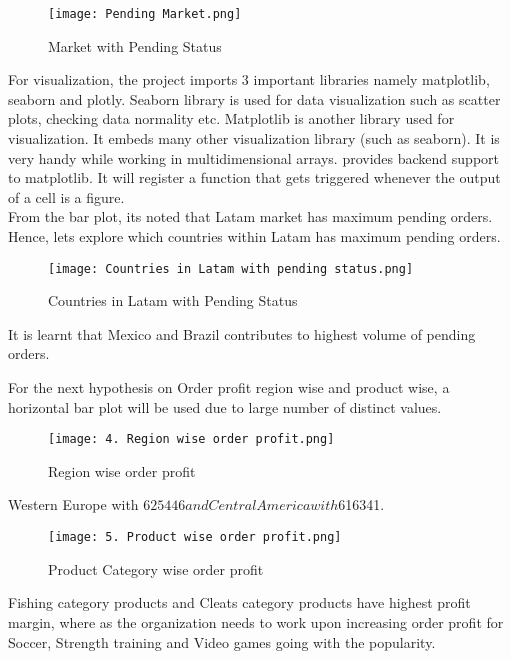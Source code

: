 \documentclass[journal,twoside,web]{ieeecolor}
\begin{document}
\begin{figure}[htbp]
\centerline{\texttt{[image: Pending Market.png]}}
\caption{Market with Pending Status}
\label{fig4 }
\end{figure}


For visualization, the project imports 3 important libraries namely matplotlib, seaborn and plotly. Seaborn library is used for data visualization such as scatter plots, checking data normality etc. Matplotlib is another library used for visualization. It embeds many other visualization library (such as seaborn). It is very handy while working in multidimensional arrays.  provides backend support to matplotlib. It will register a function that gets triggered whenever the output of a cell is a figure. \\


                                                         
From the bar plot, its noted that Latam market has maximum pending orders. Hence, lets explore which countries within Latam has maximum pending orders.

\begin{figure}[htbp]
\centerline{\texttt{[image: Countries in Latam with pending status.png]}}
\caption{Countries in Latam with Pending Status}
\label{fig5 }
\end{figure}

It is learnt that Mexico and Brazil contributes to highest volume of pending orders.

For the next hypothesis on Order profit region wise and product wise, a horizontal bar plot will be used due to large number of distinct values.
\begin{figure}[htbp]
\centerline{\texttt{[image: 4. Region wise order profit.png]}}
\caption{Region wise order profit}
\label{fig6 }
\end{figure}

Western Europe with $625446 and Central America with $616341.\\

\begin{figure}[htbp]
\centerline{\texttt{[image: 5. Product wise order profit.png]}}
\caption{Product Category wise order profit}
\label{fig7 }
\end{figure}

Fishing category products and Cleats category products have highest profit margin, where as the organization needs to work upon increasing order profit for Soccer, Strength training and Video games going with the popularity.
\end{document}
